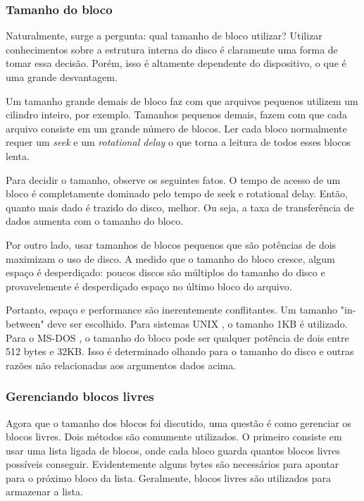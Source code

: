\documentclass{article}
\newcommand\unix{{\color{red}UNIX} }
\newcommand\msdos{{\color{yellow}MS-DOS} }
\begin{document}
\subsubsection{Tamanho do bloco}

Naturalmente, surge a pergunta: qual tamanho de bloco utilizar? Utilizar conhecimentos sobre a estrutura interna do disco é claramente uma forma de tomar essa decisão. Porém, isso é altamente dependente do dispositivo, o que é uma grande desvantagem. 

Um tamanho grande demais de bloco faz com que arquivos pequenos utilizem um cilindro inteiro, por exemplo. Tamanhos pequenos demais, fazem com que cada arquivo consiste em um grande número de blocos. Ler cada bloco normalmente requer um \textit{seek} e um \textit{rotational delay} o que torna a leitura de todos esses blocos lenta.

Para decidir o tamanho, observe os seguintes fatos. O tempo de acesso de um bloco é completamente dominado pelo tempo de seek e rotational delay. Então, quanto mais dado é trazido do disco, melhor. Ou seja, a taxa de transferência de dados aumenta com o tamanho do bloco. 

Por outro lado, usar tamanhos de blocos pequenos que são potências de dois maximizam o uso de disco. A medido que o tamanho do bloco cresce, algum espaço é desperdiçado: poucos discos são múltiplos do tamanho do disco e provavelemente é desperdiçado espaço no último bloco do arquivo.

Portanto, espaço e performance são inerentemente conflitantes. Um tamanho "in-between" deve ser escolhido. Para sistemas \unix, o tamanho 1KB é utilizado. Para o \msdos, o tamanho do bloco pode ser qualquer potência de dois entre 512 bytes e 32KB. Isso é determinado olhando para o tamanho do disco e outras razões não relacionadas aos argumentos dados acima.

\subsubsection{Gerenciando blocos livres}

Agora que o tamanho dos blocos foi discutido, uma questão é como gerenciar os blocos livres. Dois métodos são comumente utilizados. O primeiro consiste em usar uma lista ligada de blocos, onde cada bloco guarda quantos blocos livres possíveis conseguir. Evidentemente alguns bytes são necessários para apontar para o próximo bloco da lista. Geralmente, blocos livres são utilizados para armazenar a lista. 
\end{document}
